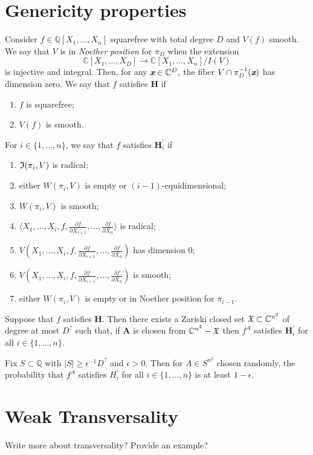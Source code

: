 \documentclass[sigconf]{acmart}
\def\xb{\textit{\textbf{x}}}
\def\C{\mathbb{C}}
\def\pa{\partial}
\def\I{\frak{I}}
\begin{document}
\section{Genericity properties}
%
Consider $f \in \mathbb{Q}[X_1,\hdots,X_n]$ squarefree with total degree $D$ and $V(f)$ smooth. We say that $V$ is in \textit{Noether position} for $\pi_D$ when the extension 
\[
\C[X_1,\hdots,X_D] \rightarrow \C[X_1,\hdots,X_n]/I(V)
\] 
is injective and integral.  Then, for any $\xb \in \C^D,$ the fiber 
$V \cap \pi_D^{-1}(\xb)$ has dimension zero. 
We say that $f$ satisfies $\textbf{H}$ if 
%
\begin{enumerate}
    \item $f$ is squarefree;
    \item $V(f)$ is smooth.
\end{enumerate}
%
For $i\in\{1,\hdots,n\}$, we say that $f$ satisfies $\textbf{H}_i^{'}$ if 
%
\begin{enumerate}
\item $\I(\pi_i,V)$ is radical;
\item either $W(\pi_i,V)$ is empty or $(i-1)$-equidimensional;
\item $W(\pi_i,V)$ is smooth;
\item $\langle X_1,\hdots,X_i, f,  \frac{\pa f}{\pa X_{i+1}},\hdots,\frac{\pa f}{\pa X_n}\rangle $ is radical; 
\item $V(X_1,\hdots,X_i, f,  \frac{\pa f}{\pa X_{i+1}},\hdots,\frac{\pa f}{\pa X_n})$ has dimension $0$;
\item $V(X_1,\hdots,X_i, f,  \frac{\pa f}{\pa X_{i+1}},\hdots,\frac{\pa f}{\pa X_n})$ is smooth;
\item either $W(\pi_i,V)$ is empty or in Noether position for $\pi_{i-1}$.
\end{enumerate}
%
\begin{theorem}
Suppose that $f$ satisfies \textbf{H}. Then there exists a Zariski closed set $\frak{X} \subset \mathbb{C}^{n^2}$ of degree at most $D^{\textrm{?}}$ such that, if $\textbf{A}$ is chosen from  $\C^{n^2}-\frak{X}$ then $f^A$ satisfies $\textbf{H}_i^{'}$ for all $i \in \{1,\hdots,n\}.$
\end{theorem}
%
\begin{corollary} 
Fix $S \subset \mathbb{Q}$ with $|S| \geq \epsilon^{-1} D^{\textrm{?}}$ and $\epsilon > 0$. Then for $A\in S^{n^2}$ chosen randomly, the probability that $f^A$ satisfies $H_i^{'}$ for all $i \in \{1,\hdots,n\}$ is at least $1-\epsilon.$
\end{corollary}
%
%
%
%
\section{Weak Transversality}
Write more about transversality? Provide an example?
%
\end{document}
